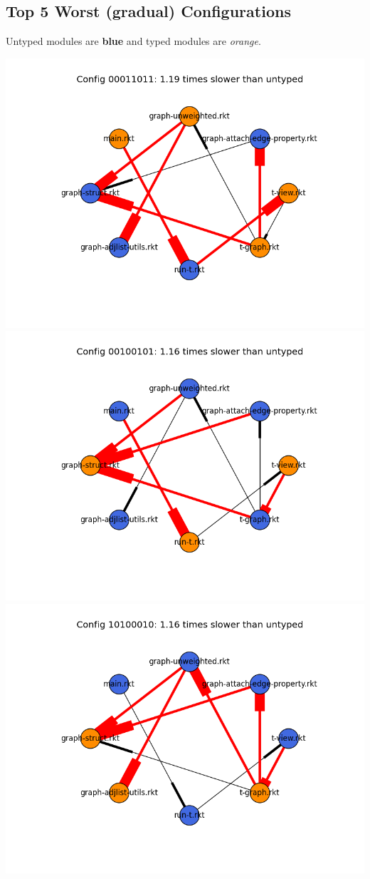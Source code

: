 \documentclass{article}
\begin{document}
\subsection{Top 5 Worst (gradual) Configurations}
Untyped modules are \textbf{blue} and typed modules are \emph{orange}.

\includegraphics[width=\textwidth]{mbta+graph-2015-04-20-module-graph-00011011.png}
\includegraphics[width=\textwidth]{mbta+graph-2015-04-20-module-graph-00100101.png}
\includegraphics[width=\textwidth]{mbta+graph-2015-04-20-module-graph-10100010.png}
\end{document}

